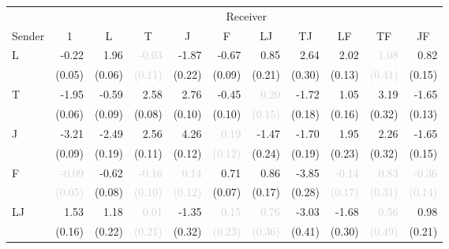 \begin{tabular}{lrrrrrrrrrr}
\toprule
& \multicolumn{10}{c}{Receiver} \\
\cmidrule(l){2-11} 
Sender & \multicolumn{1}{c}{1} & \multicolumn{1}{c}{L} & \multicolumn{1}{c}{T} & \multicolumn{1}{c}{J} & \multicolumn{1}{c}{F} & \multicolumn{1}{c}{LJ} & \multicolumn{1}{c}{TJ} & \multicolumn{1}{c}{LF} & \multicolumn{1}{c}{TF} & \multicolumn{1}{c}{JF} \\
\midrule
\multirow{2}{*}{L} &-0.22 &\cellcolor{Gray}1.96 &\textcolor{LightGray}{-0.03} &-1.87 &-0.67 &0.85 &2.64 &2.02 &\textcolor{LightGray}{1.08} &0.82\\
 &\tiny{(0.05)} &\cellcolor{Gray}\tiny{(0.06)} &\textcolor{LightGray}{\tiny{(0.11)}} &\tiny{(0.22)} &\tiny{(0.09)} &\tiny{(0.21)} &\tiny{(0.30)} &\tiny{(0.13)} &\textcolor{LightGray}{\tiny{(0.41)}} &\tiny{(0.15)}\\[1ex]
\multirow{2}{*}{T} &-1.95 &-0.59 &\cellcolor{Gray}2.58 &2.76 &-0.45 &\textcolor{LightGray}{0.20} &-1.72 &1.05 &3.19 &-1.65\\
 &\tiny{(0.06)} &\tiny{(0.09)} &\cellcolor{Gray}\tiny{(0.08)} &\tiny{(0.10)} &\tiny{(0.10)} &\textcolor{LightGray}{\tiny{(0.15)}} &\tiny{(0.18)} &\tiny{(0.16)} &\tiny{(0.32)} &\tiny{(0.13)}\\[1ex]
\multirow{2}{*}{J} &-3.21 &-2.49 &2.56 &\cellcolor{Gray}4.26 &\textcolor{LightGray}{0.19} &-1.47 &-1.70 &1.95 &2.26 &-1.65\\
 &\tiny{(0.09)} &\tiny{(0.19)} &\tiny{(0.11)} &\cellcolor{Gray}\tiny{(0.12)} &\textcolor{LightGray}{\tiny{(0.12)}} &\tiny{(0.24)} &\tiny{(0.19)} &\tiny{(0.23)} &\tiny{(0.32)} &\tiny{(0.15)}\\[1ex]
\multirow{2}{*}{F} &\textcolor{LightGray}{-0.09} &-0.62 &\textcolor{LightGray}{-0.16} &\textcolor{LightGray}{0.14} &\cellcolor{Gray}0.71 &0.86 &-3.85 &\textcolor{LightGray}{-0.14} &\textcolor{LightGray}{0.83} &\textcolor{LightGray}{-0.36}\\
 &\textcolor{LightGray}{\tiny{(0.05)}} &\tiny{(0.08)} &\textcolor{LightGray}{\tiny{(0.10)}} &\textcolor{LightGray}{\tiny{(0.12)}} &\cellcolor{Gray}\tiny{(0.07)} &\tiny{(0.17)} &\tiny{(0.28)} &\textcolor{LightGray}{\tiny{(0.17)}} &\textcolor{LightGray}{\tiny{(0.31)}} &\textcolor{LightGray}{\tiny{(0.14)}}\\[1ex]
\multirow{2}{*}{LJ} &1.53 &1.18 &\textcolor{LightGray}{0.01} &-1.35 &\textcolor{LightGray}{0.15} &\cellcolor{Gray}\textcolor{LightGray}{0.76} &-3.03 &-1.68 &\textcolor{LightGray}{0.56} &0.98\\
 &\tiny{(0.16)} &\tiny{(0.22)} &\textcolor{LightGray}{\tiny{(0.21)}} &\tiny{(0.32)} &\textcolor{LightGray}{\tiny{(0.23)}} &\cellcolor{Gray}\textcolor{LightGray}{\tiny{(0.36)}} &\tiny{(0.41)} &\tiny{(0.30)} &\textcolor{LightGray}{\tiny{(0.49)}} &\tiny{(0.21)}\\[1ex]

\end{tabular}
